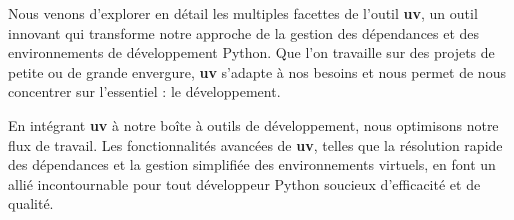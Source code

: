 \begin{center}
\end{center}

Nous venons d'explorer en détail les multiples facettes de l'outil \textbf{uv}, un outil innovant qui transforme notre approche de la gestion des dépendances et des environnements de développement Python. Que l'on travaille sur des projets de petite ou de grande envergure, \textbf{uv} s'adapte à nos besoins et nous permet de nous concentrer sur l'essentiel : le développement. 

En intégrant \textbf{uv} à notre boîte à outils de développement, nous optimisons notre flux de travail. Les fonctionnalités avancées de \textbf{uv}, telles que la résolution rapide des dépendances et la gestion simplifiée des environnements virtuels, en font un allié incontournable pour tout développeur Python soucieux d'efficacité et de qualité.

